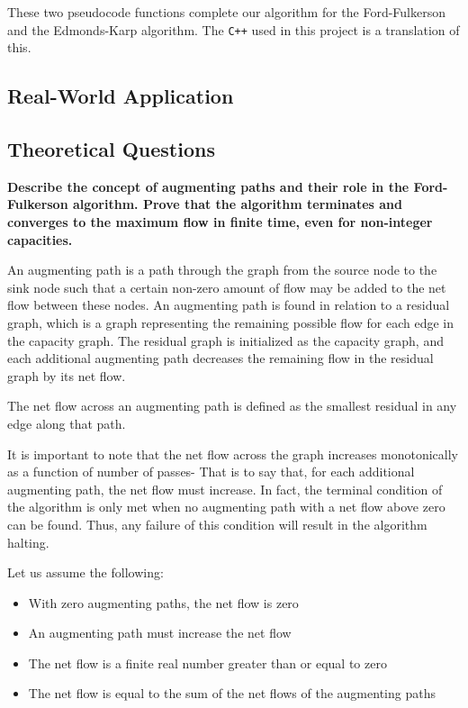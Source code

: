 \documentclass[12pt]{amsart}
\begin{document}
    These two pseudocode functions complete our algorithm for
    the Ford-Fulkerson and the Edmonds-Karp algorithm. The
    \verb|C++| used in this project is a translation of this.

\subsection{Real-World Application}


\subsection{Theoretical Questions}

    \textbf{Describe the concept of augmenting paths and
    their role in the Ford-Fulkerson algorithm. Prove that the
    algorithm terminates and converges to the maximum flow in
    finite time, even for non-integer capacities.}

    An augmenting path is a path through the graph from the
    source node to the sink node such that a certain non-zero
    amount of flow may be added to the net flow between these
    nodes. An augmenting path is found in relation to a residual
    graph, which is a graph representing the remaining possible
    flow for each edge in the capacity graph. The residual graph
    is initialized as the capacity graph, and each additional
    augmenting path decreases the remaining flow in the residual
    graph by its net flow.

    The net flow across an augmenting path is defined as the
    smallest residual in any edge along that path.

    It is important to note that the net flow across the graph
    increases monotonically as a function of number of passes-
    That is to say that, for each additional augmenting path,
    the net flow must increase. In fact, the terminal condition
    of the algorithm is only met when no augmenting path with a
    net flow above zero can be found. Thus, any failure of this
    condition will result in the algorithm halting.

    Let us assume the following:
    \begin{itemize}
        \item With zero augmenting paths, the net flow is zero
        \item An augmenting path must increase the net flow
        \item The net flow is a finite real number greater than
            or equal to zero
        \item The net flow is equal to the sum of the net flows
            of the augmenting paths
    \end{itemize}
\end{document}
